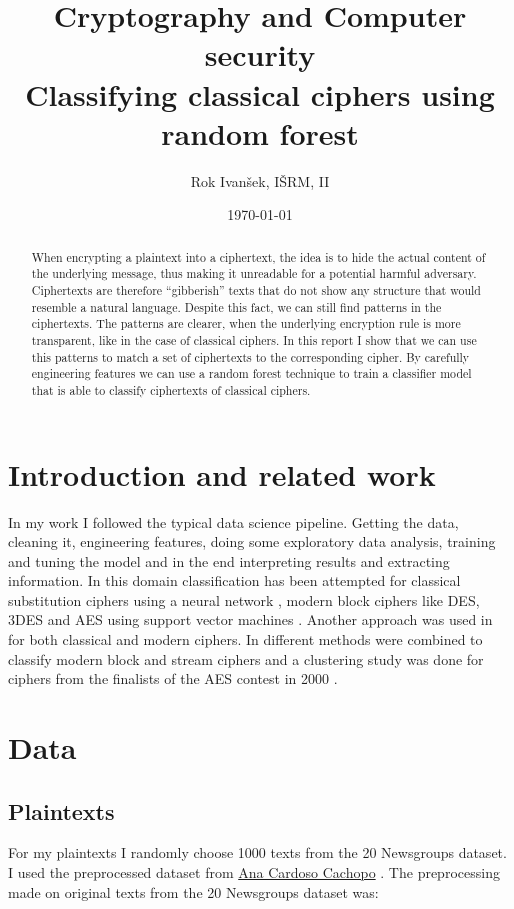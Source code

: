 \documentclass[a4paper]{article}
\title{Cryptography and Computer security\\
Classifying classical ciphers using random forest}
\author{Rok Ivanšek, IŠRM, II}
\date{\today}
\begin{document}
\maketitle


\begin{abstract}
When encrypting a plaintext into a ciphertext, the idea is to hide the actual content of the underlying message, thus making it unreadable for a potential harmful adversary. Ciphertexts are therefore ``gibberish'' texts that do not show any structure that would resemble a natural language. Despite this fact, we can still find patterns in the ciphertexts. The patterns are clearer, when the underlying encryption rule is more transparent, like in the case of classical ciphers. In this report I show that we can use this patterns to match a set of ciphertexts to the corresponding cipher. By carefully engineering features we can use a random forest technique to train a classifier model that is able to classify ciphertexts of classical ciphers.
\end{abstract}

\section*{Introduction and related work}
In my work I followed the typical data science pipeline. Getting the data, cleaning it, engineering features, doing some exploratory data analysis, training and tuning the model and in the end interpreting results and extracting information. In this domain classification has been attempted for classical substitution ciphers using a neural network \cite{sivagurunathan2010classification}, modern block ciphers like DES, 3DES and AES using support vector machines \cite{dileep2006identification}. Another approach was used in \cite{maheshwari2001classification} for both classical and modern ciphers. In \cite{mishra2013pattern} different methods were combined to classify modern block and stream ciphers and a clustering study was done for ciphers from the finalists of the AES contest in 2000 \cite{decipher}.

\section*{Data}

\subsection*{Plaintexts}
For my plaintexts I randomly choose 1000 texts from the 20 Newsgroups dataset. I used the preprocessed dataset from \href{http://ana.cachopo.org/datasets-for-single-label-text-categorization}{Ana Cardoso Cachopo} \cite{2007:phd-Ana-Cardoso-Cachopo}. The preprocessing made on original texts from the 20 Newsgroups dataset was:
\end{document}
